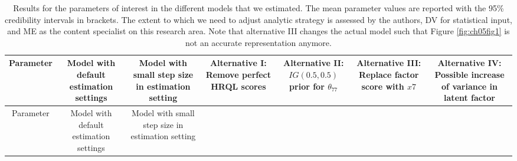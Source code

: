 \documentclass[openright,titlepage,12pt,a4paper]{book}
\begin{document}
\begin{longtable}[]{@{}ccccccc@{}}
\caption{\label{tab:ch05tab3} Results for the parameters of interest in the different models that we estimated. The mean parameter values are reported with the 95\% credibility intervals in brackets. The extent to which we need to adjust analytic strategy is assessed by the authors, DV for statistical input, and ME as the content specialist on this research area. Note that alternative III changes the actual model such that Figure \ref{fig:ch05fig1} is not an accurate representation anymore.}\tabularnewline
\toprule
\begin{minipage}[b]{0.11\columnwidth}\centering
Parameter\strut
\end{minipage} & \begin{minipage}[b]{0.12\columnwidth}\centering
Model with default
estimation settings\strut
\end{minipage} & \begin{minipage}[b]{0.13\columnwidth}\centering
Model with small
step size in
estimation setting\strut
\end{minipage} & \begin{minipage}[b]{0.11\columnwidth}\centering
Alternative I:
Remove perfect
HRQL scores\strut
\end{minipage} & \begin{minipage}[b]{0.11\columnwidth}\centering
Alternative II:
\(IG(0.5, 0.5)\)
prior for
\(\theta_{77}\)\strut
\end{minipage} & \begin{minipage}[b]{0.11\columnwidth}\centering
Alternative III:
Replace factor
score with \(x7\)\strut
\end{minipage} & \begin{minipage}[b]{0.12\columnwidth}\centering
Alternative IV:
Possible increase
of variance in
latent factor\strut
\end{minipage}\tabularnewline
\midrule
\endfirsthead
\toprule
\begin{minipage}[b]{0.11\columnwidth}\centering
Parameter\strut
\end{minipage} & \begin{minipage}[b]{0.12\columnwidth}\centering
Model with default
estimation settings\strut
\end{minipage} & \begin{minipage}[b]{0.13\columnwidth}\centering
Model with small
step size in
estimation setting\strut
\end{minipage} & \begin{minipage}[b]{0.11\columnwidth}\centering

\end{minipage}
\end{longtable}
\end{document}

